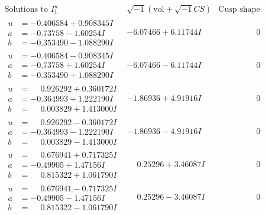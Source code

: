\documentclass[1p]{elsarticle_modified}
\theoremstyle{definition}
\newcommand{\I}{\sqrt{-1}}
\begin{document}
$$\begin{array}{c|c|c}  
\text{Solutions to }I^u_{1}& \I (\text{vol} + \sqrt{-1}CS) & \text{Cusp shape}\\
 \hline 
\begin{aligned}
u &= -0.406584 + 0.908345 I \\
a &= -0.73758 - 1.60254 I \\
b &= -0.353490 - 1.088290 I\end{aligned}
 & -6.07466 + 6.11744 I & \phantom{-0.000000 } 0 \\ \hline\begin{aligned}
u &= -0.406584 - 0.908345 I \\
a &= -0.73758 + 1.60254 I \\
b &= -0.353490 + 1.088290 I\end{aligned}
 & -6.07466 - 6.11744 I & \phantom{-0.000000 } 0 \\ \hline\begin{aligned}
u &= \phantom{-}0.926292 + 0.360172 I \\
a &= -0.364993 + 1.222190 I \\
b &= \phantom{-}0.003829 + 1.413000 I\end{aligned}
 & -1.86936 + 4.91916 I & \phantom{-0.000000 } 0 \\ \hline\begin{aligned}
u &= \phantom{-}0.926292 - 0.360172 I \\
a &= -0.364993 - 1.222190 I \\
b &= \phantom{-}0.003829 - 1.413000 I\end{aligned}
 & -1.86936 - 4.91916 I & \phantom{-0.000000 } 0 \\ \hline\begin{aligned}
u &= \phantom{-}0.676941 + 0.717325 I \\
a &= -0.49905 + 1.47156 I \\
b &= \phantom{-}0.815322 + 1.061790 I\end{aligned}
 & \phantom{-}0.25296 + 3.46087 I & \phantom{-0.000000 } 0 \\ \hline\begin{aligned}
u &= \phantom{-}0.676941 - 0.717325 I \\
a &= -0.49905 - 1.47156 I \\
b &= \phantom{-}0.815322 - 1.061790 I\end{aligned}
 & \phantom{-}0.25296 - 3.46087 I & \phantom{-0.000000 } 0 \\ \hline\begin{aligned}

\end{aligned}
\end{array}$$
\end{document}
